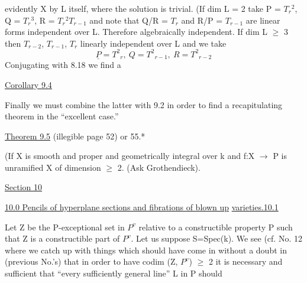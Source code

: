 
evidently X by L itself, where the solution is trivial.  (If dim L
= 2 take P = $T_r{}^2$, Q = $T_r{}^3$, R = $T_r{}^2T_{r-1}$ and note that Q/R = $T_r$ and R/P
= $T_{r-1}$ are linear forms independent over L.  Therefore
algebraically independent.  If dim L $\geq$ 3 then $T_{r-2}$, $T_{r-1}$, $T_r$
linearly independent over L and we take
\[ \underline{P} = {T^2}_r, \ Q = {T^2}_{r-1}, \ R = {T^2}_{r-2} \]
Conjugating with 8.18 we find a

\uline{Corollary 9.4}

Finally we must combine the latter with 9.2 in order to find
a recapitulating theorem in the ``excellent case.''

\uline{Theorem 9.5}  (illegible page 52) or 55.*

(If X is smooth and proper and geometrically integral over k and
f:X $\rightarrow$ P is unramified X of dimension $\geq$ 2.  (Ask Grothendieck).

\uline{Section 10}

\uline{10.0  Pencils of hyperplane sections and fibrations of blown up}
\uline{varieties.10.1}

Let Z be the P-exceptional set in $P^{v}$ relative to a
constructible property P such that Z is a constructible part of $P^{v}$.
Let us suppose S=Spec(k).  We see (cf. No. 12 where we catch up
with things which should have come in without a doubt in (previous
No.'s) that in order to have codim (Z, $P^{v}$) $\geq$ 2 it is necessary and
sufficient that ``every sufficiently general line'' L in P should

